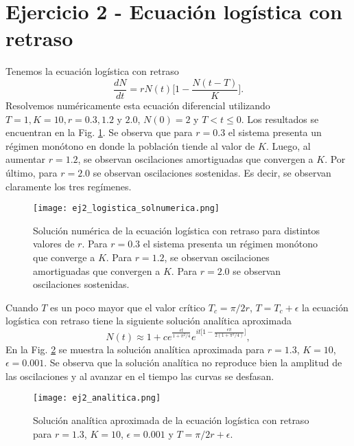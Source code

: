 \documentclass[letterpaper,12pt]{article}
\theoremstyle{plain}
\begin{document}
\section*{Ejercicio 2 - Ecuación logística con retraso}

Tenemos la ecuación logística con retraso
\begin{equation}
    \frac{dN}{dt} = rN(t) \biggr[ 1 - \frac{N (t - T)}{K} \biggr].
\end{equation}
Resolvemos numéricamente esta ecuación diferencial utilizando $T = 1, K = 10, r = 0.3, 1.2$ y $2.0$, $N(0) = 2$ y $T < t \leq 0$. Los resultados se encuentran en la Fig. \ref*{fig:ej2_logistica_solnumerica}. Se observa que para $r=0.3$ el sistema presenta un régimen monótono en donde la población tiende al valor de $K$. Luego, al aumentar $r=1.2$, se observan oscilaciones amortiguadas que convergen a $K$. Por último, para $r=2.0$ se observan oscilaciones sostenidas. Es decir, se observan claramente los tres regímenes.

\begin{figure}[h]
    \centering
    \texttt{[image: ej2\_logistica\_solnumerica.png]}
    \caption{Solución numérica de la ecuación logística con retraso para distintos valores de $r$. Para $r=0.3$ el sistema presenta un régimen monótono que converge a $K$. Para $r=1.2$, se observan oscilaciones amortiguadas que convergen a $K$. Para $r=2.0$ se observan oscilaciones sostenidas.} 
    \label{fig:ej2_logistica_solnumerica}
\end{figure}

Cuando $T$ es un poco mayor que el valor crítico $T_c = \pi/2r$, $T = T_c + \epsilon$ la ecuación logística con retraso tiene la siguiente solución analítica aproximada
\begin{equation}
    N(t) \approx 1 + c e^{\frac{\epsilon t}{1 + \pi^2/4}} e^{it \biggr[ 1 - \frac{\epsilon \pi}{2 (1 + \pi^2/4)}\biggr]},
\end{equation}
En la Fig. \ref*{fig:ej2_analitica} se muestra la solución analítica aproximada para $r=1.3$, $K=10$, $\epsilon = 0.001 $. Se observa que la solución analítica no reproduce bien la amplitud de las oscilaciones y al avanzar en el tiempo las curvas se desfasan.

\begin{figure}[h]
    \centering
    \texttt{[image: ej2\_analitica.png]}
    \caption{ Solución analítica aproximada de la ecuación logística con retraso para $r=1.3$, $K=10$, $\epsilon = 0.001 $ y $T = \pi/2r + \epsilon$.} 
    \label{fig:ej2_analitica}
\end{figure}
\end{document}

